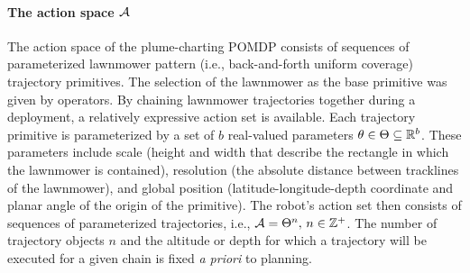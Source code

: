 \paragraph{The action space $\mathcal{A}$} The action space of the plume-charting POMDP consists of sequences of parameterized lawnmower pattern (i.e., back-and-forth uniform coverage) trajectory primitives. The selection of the lawnmower as the base primitive was given by \Sentry operators. By chaining lawnmower trajectories together during a deployment, a relatively expressive action set is available. Each trajectory primitive is parameterized by a set of $b$ real-valued parameters $\theta \in \Theta \subseteq \mathbb{R}^b$. These parameters include scale (height and width that describe the rectangle in which the lawnmower is contained), resolution (the absolute distance between tracklines of the lawnmower), and global position (latitude-longitude-depth coordinate and planar angle of the origin of the primitive). The robot's action set then consists of sequences of parameterized trajectories, i.e., $\mathcal{A} = \Theta^n, \, n \in \mathbb{Z}^+$. The number of trajectory objects $n$ and the altitude or depth for which a trajectory will be executed for a given chain is fixed \emph{a priori} to planning. 

